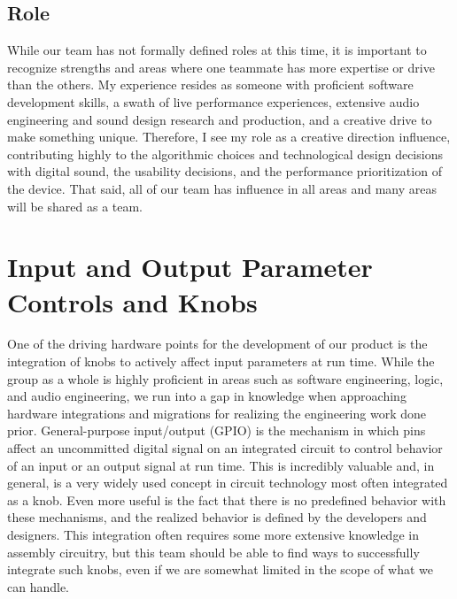 \documentclass[onecolumn, draftclsnofoot,10pt, compsoc]{IEEEtran}
\begin{document}
\subsection{Role}
    While our team has not formally defined roles at this time, it is important to recognize strengths and areas where one teammate has more expertise or drive than the others. My experience resides as someone with proficient software development skills, a swath of live performance experiences, extensive audio engineering and sound design research and production, and a creative drive to make something unique. Therefore, I see my role as a creative direction influence, contributing highly to the algorithmic choices and technological design decisions with digital sound, the usability decisions, and the performance prioritization of the device. That said, all of our team has influence in all areas and many areas will be shared as a team. 


\section{Input and Output Parameter Controls and Knobs}
	One of the driving hardware points for the development of our product is the integration of knobs to actively affect input parameters at run time. While the group as a whole is highly proficient in areas such as software engineering, logic, and audio engineering, we run into a gap in knowledge when approaching hardware integrations and migrations for realizing the engineering work done prior. General-purpose input/output (GPIO) is the mechanism in which pins affect an uncommitted digital signal on an integrated circuit to control behavior of an input or an output signal at run time. This is incredibly valuable and, in general, is a very widely used concept in circuit technology most often integrated as a knob. Even more useful is the fact that there is no predefined behavior with these mechanisms, and the realized behavior is defined by the developers and designers. This integration often requires some more extensive knowledge in assembly circuitry, but this team should be able to find ways to successfully integrate such knobs, even if we are somewhat limited in the scope of what we can handle.
\end{document}
